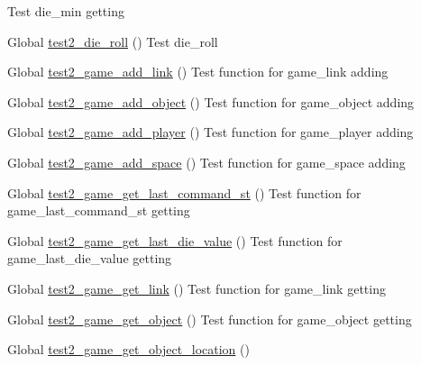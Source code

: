 \begin{DoxyRefList}
%
Test die\+\_\+min getting  
\item[Global \mbox{\hyperlink{die__test_8c_af7df60d905acf9505f1e434c6f75d027}{test2\+\_\+die\+\_\+roll}} ()]\label{test__test000008}%
%
Test die\+\_\+roll  
\item[Global \mbox{\hyperlink{game__test_8c_af5c4dd79b2a7b67adbeeb8df5791a5de}{test2\+\_\+game\+\_\+add\+\_\+link}} ()]\label{test__test000024}%
%
Test function for game\+\_\+link adding  
\item[Global \mbox{\hyperlink{game__test_8c_ab996895e69c5d41fab5515e88aed3975}{test2\+\_\+game\+\_\+add\+\_\+object}} ()]\label{test__test000016}%
%
Test function for game\+\_\+object adding  
\item[Global \mbox{\hyperlink{game__test_8c_a42bb53c500bf8ae4dce0e144a85cd80b}{test2\+\_\+game\+\_\+add\+\_\+player}} ()]\label{test__test000021}%
%
Test function for game\+\_\+player adding  
\item[Global \mbox{\hyperlink{game__test_8c_aed0f40f3ab1c252e548b038542d7409d}{test2\+\_\+game\+\_\+add\+\_\+space}} ()]\label{test__test000019}%
%
Test function for game\+\_\+space adding  
\item[Global \mbox{\hyperlink{game__test_8c_ab2899b7f0c48251cec8cccdbb353c0f1}{test2\+\_\+game\+\_\+get\+\_\+last\+\_\+command\+\_\+st}} ()]\label{test__test000051}%
%
Test function for game\+\_\+last\+\_\+command\+\_\+st getting  
\item[Global \mbox{\hyperlink{game__test_8c_a28c6f19f65d7fbd26ba1f96e476feffc}{test2\+\_\+game\+\_\+get\+\_\+last\+\_\+die\+\_\+value}} ()]\label{test__test000047}%
%
Test function for game\+\_\+last\+\_\+die\+\_\+value getting  
\item[Global \mbox{\hyperlink{game__test_8c_a9d9fe90216f392c5cb61aff46555524f}{test2\+\_\+game\+\_\+get\+\_\+link}} ()]\label{test__test000033}%
%
Test function for game\+\_\+link getting  
\item[Global \mbox{\hyperlink{game__test_8c_a967cc4c5f6555e32a3c9e4dcb924c65f}{test2\+\_\+game\+\_\+get\+\_\+object}} ()]\label{test__test000030}%
%
Test function for game\+\_\+object getting  
\item[Global \mbox{\hyperlink{game__test_8c_a635a940244bbb00d432a6accee598c20}{test2\+\_\+game\+\_\+get\+\_\+object\+\_\+location}} ()]\label{test__test000044}%

\end{DoxyRefList}

